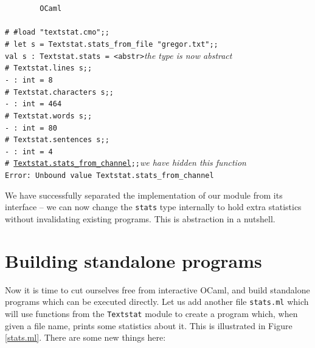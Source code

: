\documentclass[]{book}
\newcommand{\smspace}{\vspace{4mm}}
\begin{document}
\smspace
\noindent\verb!        OCaml!\\
\noindent\\
\texttt{\# \#load "textstat.cmo";;}\\
\texttt{\#~let~s~=~Textstat.stats\_from\_file "gregor.txt";;}\\
\texttt{val s :\ Textstat.stats = <abstr>}\hfill\textit{the type is now abstract}\\
\texttt{\# Textstat.lines s;;}\\
\texttt{- :\ int = 8}\\
\texttt{\# Textstat.characters s;;}\\
\texttt{- :\ int = 464}\\
\texttt{\# Textstat.words s;;}\\
\texttt{- :\ int = 80}\\
\texttt{\# Textstat.sentences s;;}\\
\texttt{- :\ int = 4}\\
\texttt{\# \underline{Textstat.stats\_from\_channel\vphantom{g}};;}\hfill\textit{we have hidden this function}\\
\texttt{Error:\ Unbound value Textstat.stats\_from\_channel}\vphantom{g}
\smspace

\noindent We have successfully separated the implementation of our module from its interface -- we can now change the \texttt{stats} type internally to hold extra statistics without invalidating existing programs. This is abstraction in a nutshell.
 
\section*{Building standalone programs}

Now it is time to cut ourselves free from interactive OCaml, and build standalone programs which can be executed directly. Let us add another file \texttt{stats.ml} which  will use functions from the \texttt{Textstat} module to create a program which, when given a file name, prints some statistics about it. This is illustrated in Figure \ref{stats.ml}. There are some new things here:
\end{document}
